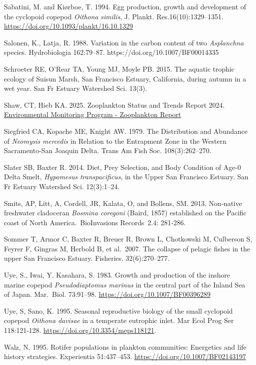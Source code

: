 \documentclass[
  letterpaper,
]{article}
\begin{document}
Sabatini, M. and Kiørboe, T. 1994. Egg production, growth and
development of the cyclopoid copepod \emph{Oithona similis}, J. Plankt.
Res.16(10):1329--1351. \url{https://doi.org/10.1093/plankt/16.10.1329}

Salonen, K., Latja, R. 1988. Variation in the carbon content of two
\emph{Asplanchna} species. Hydrobiologia 162:79--87.
https://doi.org/10.1007/BF00014335

Schroeter RE, O'Rear TA, Young MJ, Moyle PB. 2015. The aquatic trophic
ecology of Suisun Marsh, San Francisco Estuary, California, during
autumn in a wet year. San Fr Estuary Watershed Sci. 13(3).

Shaw, CT, Hieb KA. 2025. Zooplankton Status and Trends Report 2024.
\href{https://emp-dwr.github.io/emp-website/qmd-files/website/zoop/zoop-report.html\#introduction}{Environmental
Monitoring Program - Zooplankton Report}

Siegfried CA, Kopache ME, Knight AW. 1979. The Distribution and
Abundance of \emph{Neomysis mercedis} in Relation to the Entrapment Zone
in the Western Sacramento-San Joaquin Delta. Trans Am Fish Soc.
108(3):262--270.

Slater SB, Baxter R. 2014. Diet, Prey Selection, and Body Condition of
Age-0 Delta Smelt, \emph{Hypomesus transpacificus}, in the Upper San
Francisco Estuary. San Fr Estuary Watershed Sci. 12(3):1--24.

Smits, AP, Litt, A, Cordell, JR, Kalata, O, and Bollens, SM. 2013.
Non-native freshwater cladoceran \emph{Bosmina coregoni} (Baird, 1857)
established on the Pacific coast of North America.~BioInvasions
Records~2.4: 281-286.

Sommer T, Armor C, Baxter R, Breuer R, Brown L, Chotkowski M, Culberson
S, Feyrer F, Gingras M, Herbold B, et al.~2007. The collapse of pelagic
fishes in the upper San Francisco Estuary. Fisheries. 32(6):270--277.

Uye, S., Iwai, Y. Kasahara, S. 1983. Growth and production of the
inshore marine copepod \emph{Pseudodiaptomus marinus} in the central
part of the Inland Sea of Japan. Mar.~Biol. 73:91--98.
\url{https://doi.org/10.1007/BF00396289}

Uye, S, Sano, K. 1995. Seasonal reproductive biology of the small
cyclopoid copepod \emph{Oithona davisae} in a temperate eutrophic inlet.
Mar Ecol Prog Ser 118:121-128. \url{https://doi.org/10.3354/meps118121}.

Walz, N. 1995. Rotifer populations in plankton communities: Energetics
and life history strategies. Experientia 51:437--453.
\url{https://doi.org/10.1007/BF02143197}
\end{document}
